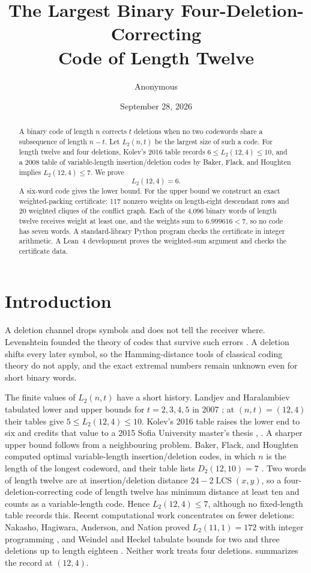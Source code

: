 \documentclass[11pt]{article}
\title{\bfseries The Largest Binary Four-Deletion-Correcting\\
Code of Length Twelve}
\author{Anonymous}
\date{September 28, 2026}
\theoremstyle{definition}
\newcommand{\lcs}{\operatorname{LCS}}
\begin{document}
\maketitle

\begin{abstract}
A binary code of length $n$ corrects $t$ deletions when no two codewords
share a subsequence of length $n-t$.  Let $L_2(n,t)$ be the largest size of
such a code.  For length twelve and four deletions, Kolev's 2016 table
records $6\leq L_2(12,4)\leq10$, and a 2008 table of variable-length
insertion/deletion codes by Baker, Flack, and Houghten implies
$L_2(12,4)\leq7$.  We prove
\[
  L_2(12,4)=6.
\]
A six-word code gives the lower bound.  For the upper bound we construct an
exact weighted-packing certificate: 117 nonzero weights on length-eight
descendant rows and 20 weighted cliques of the conflict graph.  Each of the
4,096 binary words of length twelve receives weight at least one, and the
weights sum to $6.999616<7$, so no code has seven words.  A standard-library
Python program checks the certificate in integer arithmetic.  A Lean~4
development proves the weighted-sum argument and checks the certificate data.
\end{abstract}

\section{Introduction}

A deletion channel drops symbols and does not tell the receiver where.
Levenshtein founded the theory of codes that survive such errors
\cite{levenshtein1966binary}.  A deletion shifts every later symbol, so the
Hamming-distance tools of classical coding theory do not apply, and the exact
extremal numbers remain unknown even for short binary words.

The finite values of $L_2(n,t)$ have a short history.  Landjev and Haralambiev
tabulated lower and upper bounds for $t=2,3,4,5$ in 2007
\cite{landjev2007multiple}; at $(n,t)=(12,4)$ their tables give
$5\leq L_2(12,4)\leq10$.  Kolev's 2016 table raises the lower end to six and
credits that value to a 2015 Sofia University master's thesis
\cite[Table~1]{kolev2016optimal}, \cite{landgev2015thesis}.  A sharper upper bound follows from a
neighbouring problem.  Baker, Flack, and Houghten computed optimal
variable-length insertion/deletion codes, in which $n$ is the length of the
longest codeword, and their table lists $D_2(12,10)=7$
\cite{baker2008variable,houghtenTable}.  Two words of length twelve are at
insertion/deletion distance $24-2\lcs(x,y)$, so a four-deletion-correcting
code of length twelve has minimum distance at least ten and counts as a
variable-length code.  Hence $L_2(12,4)\leq7$, although no fixed-length table
records this.  Recent computational work concentrates on
fewer deletions: Nakasho, Hagiwara, Anderson, and Nation proved
$L_2(11,1)=172$ with integer programming \cite{nakasho2023tight}, and Weindel
and Heckel tabulate bounds for two and three deletions up to length eighteen
\cite{weindel2026llm}.  Neither work treats four deletions.   summarizes the record at $(12,4)$.
\end{document}
